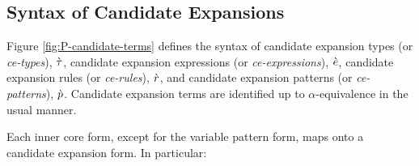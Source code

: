 \subsection{Syntax of Candidate Expansions}\label{sec:ce-syntax-P}
Figure \ref{fig:P-candidate-terms} defines the syntax of candidate expansion types (or \emph{ce-types}), $\grave{\tau}$, candidate expansion expressions (or \emph{ce-expressions}), $\grave{e}$, candidate expansion rules (or \emph{ce-rules}), $\grave{r}$, and candidate expansion patterns (or \emph{ce-patterns}), $\grave{p}$. %
Candidate expansion terms are identified up to $\alpha$-equivalence in the usual manner.

Each inner core form, except for the variable pattern form, maps onto a candidate expansion form. In particular:


